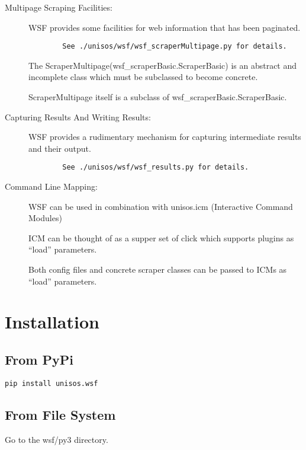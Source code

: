 \documentclass{article}
\begin{document}
\begin{description}
  \item[Multipage Scraping Facilities:]
        WSF provides some facilities for web information that has been paginated.
\begin{verbatim}
        See ./unisos/wsf/wsf_scraperMultipage.py for details.
\end{verbatim}

        The ScraperMultipage(wsf\_scraperBasic.ScraperBasic) is an abstract and incomplete class which must be subclassed
        to become concrete.

        ScraperMultipage itself is a subclass of wsf\_scraperBasic.ScraperBasic.


  \item[Capturing Results And Writing Results:]
        WSF provides a rudimentary mechanism for capturing intermediate results and their output.
\begin{verbatim}
        See ./unisos/wsf/wsf_results.py for details.
\end{verbatim}

  \item[Command Line Mapping:]
        WSF can be used in combination with unisos.icm (Interactive Command Modules)

        ICM can be thought of as a supper set of click which supports plugins as
        ``load'' parameters.

        Both config files and concrete scraper classes can be passed to ICMs as ``load''
        parameters.

\end{description}

\section{Installation}

\subsection{From PyPi}

\begin{verbatim}
pip install unisos.wsf
\end{verbatim}

\subsection{From File System}

Go to the wsf/py3 directory.
\end{document}
